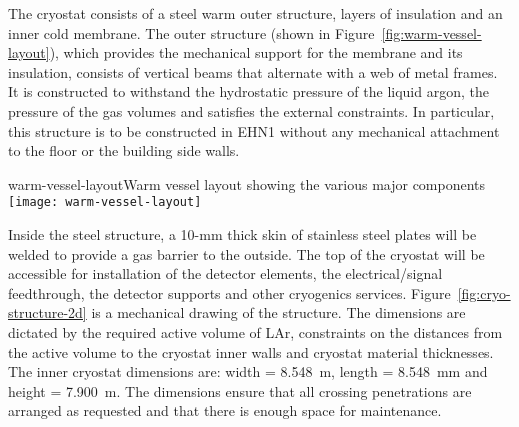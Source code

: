 The cryostat consists of a steel warm outer structure, layers of insulation and an inner cold membrane.  The outer %
structure (shown in Figure~\ref{fig:warm-vessel-layout}), which provides %
the mechanical support for the  %
membrane and its insulation,  consists of vertical beams that alternate with a web of metal frames. It is constructed to %
withstand the hydrostatic pressure of the liquid argon, the pressure of the gas volumes and %
satisfies the external constraints. %
In particular, this structure is to be constructed in EHN1 without any mechanical attachment to the floor or the building side walls.  
%
\begin{cdrfigure}{warm-vessel-layout}{Warm vessel layout showing the various major components}
  \texttt{[image: warm-vessel-layout]}
\end{cdrfigure}
%
Inside the steel structure, a 10-mm thick skin of stainless steel plates will be welded to provide a gas barrier to the outside.
The top of the cryostat will be accessible for installation of the detector elements, the electrical/signal feedthrough, the detector supports and other cryogenics services.  Figure~\ref{fig:cryo-structure-2d} is a mechanical drawing of the structure. The dimensions %
are dictated by the required %
active volume of LAr, constraints on the distances from the active volume to the cryostat inner walls and cryostat material thicknesses.  %
The inner cryostat dimensions are: width = 8.548~m, length = 8.548~mm and height = 7.900~m. The dimensions 
ensure that all crossing penetrations are arranged as requested and that there is enough space for maintenance. 

